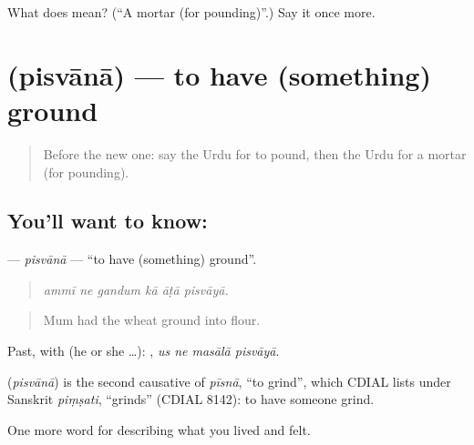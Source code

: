 \begin{tcolorbox}[breakable,colback=teal!4,colframe=teal!35!black,title={Before you move on}]
What does  mean? (\textquotedblleft{}A mortar (for pounding)\textquotedblright{}.) Say it once more.
\end{tcolorbox}
\section[\texorpdfstring{\ur{پسوانا} (pisvānā)}{پسوانا (pisvānā)}]{ (pisvānā) — to have (something) ground}

\label{lesson:UR-C510-pisvana}



\begin{quote}
Before the new one: say the Urdu for to pound, then the Urdu for a mortar (for pounding).
\end{quote}

\subsection*{You'll want to know: }
\textbf{} — \emph{pisvānā} — \textquotedblleft{}to have (something) ground\textquotedblright{}.

\begin{quote}
     
\end{quote}

\begin{quote}
\emph{ammī ne gandum kā āṭā pisvāyā.}
\end{quote}

\begin{quote}
Mum had the wheat ground into flour.
\end{quote}

Past, with  (he or she …):    , \emph{us ne masālā pisvāyā}.

\begin{cousinweb}
\textbf{} (\emph{pisvānā}) is the second causative of \emph{pīsnā}, \textquotedblleft{}to grind\textquotedblright{}, which CDIAL lists under Sanskrit \emph{piṃṣati}, \textquotedblleft{}grinds\textquotedblright{} (CDIAL 8142): to have someone grind.
\end{cousinweb}

\begin{grammarlens}[title={What you've built}]
One more word for describing what you lived and felt.
\end{grammarlens}

